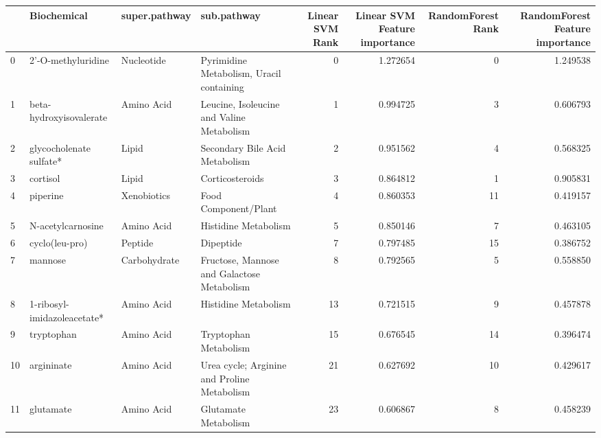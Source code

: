 \begin{tabular}{llllrrrr}
\toprule
{} &                  Biochemical & super.pathway &                                  sub.pathway &  Linear SVM Rank &  Linear SVM Feature importance &  RandomForest Rank &  RandomForest Feature importance \\
\midrule
0  &           2'-O-methyluridine &    Nucleotide &     Pyrimidine Metabolism, Uracil containing &                0 &                       1.272654 &                  0 &                         1.249538 \\
1  &      beta-hydroxyisovalerate &    Amino Acid &    Leucine, Isoleucine and Valine Metabolism &                1 &                       0.994725 &                  3 &                         0.606793 \\
2  &      glycocholenate sulfate* &         Lipid &               Secondary Bile Acid Metabolism &                2 &                       0.951562 &                  4 &                         0.568325 \\
3  &                     cortisol &         Lipid &                              Corticosteroids &                3 &                       0.864812 &                  1 &                         0.905831 \\
4  &                     piperine &   Xenobiotics &                         Food Component/Plant &                4 &                       0.860353 &                 11 &                         0.419157 \\
5  &            N-acetylcarnosine &    Amino Acid &                         Histidine Metabolism &                5 &                       0.850146 &                  7 &                         0.463105 \\
6  &               cyclo(leu-pro) &       Peptide &                                    Dipeptide &                7 &                       0.797485 &                 15 &                         0.386752 \\
7  &                      mannose &  Carbohydrate &   Fructose, Mannose and Galactose Metabolism &                8 &                       0.792565 &                  5 &                         0.558850 \\
8  &  1-ribosyl-imidazoleacetate* &    Amino Acid &                         Histidine Metabolism &               13 &                       0.721515 &                  9 &                         0.457878 \\
9  &                   tryptophan &    Amino Acid &                        Tryptophan Metabolism &               15 &                       0.676545 &                 14 &                         0.396474 \\
10 &                   argininate &    Amino Acid &  Urea cycle; Arginine and Proline Metabolism &               21 &                       0.627692 &                 10 &                         0.429617 \\
11 &                    glutamate &    Amino Acid &                         Glutamate Metabolism &               23 &                       0.606867 &                  8 &                         0.458239 \\
\bottomrule
\end{tabular}
